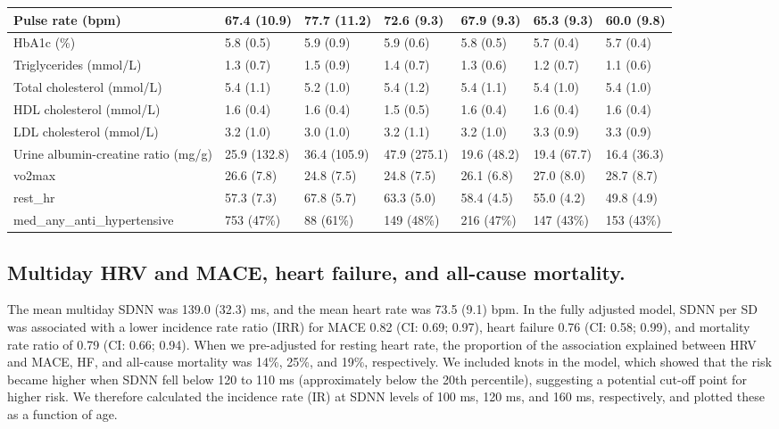 \documentclass[
  a4paper,
  headsepline=true,
  open=any]{scrbook}
\begin{document}
\begin{table}
{\begin{tabular}{l|l|l|l|l|l|l}
\hline
Pulse rate (bpm) & 67.4 (10.9) & 77.7 (11.2) & 72.6 (9.3) & 67.9 (9.3) & 65.3 (9.3) & 60.0 (9.8)\\
\hline
HbA1c (\%) & 5.8 (0.5) & 5.9 (0.9) & 5.9 (0.6) & 5.8 (0.5) & 5.7 (0.4) & 5.7 (0.4)\\
\hline
Triglycerides (mmol/L) & 1.3 (0.7) & 1.5 (0.9) & 1.4 (0.7) & 1.3 (0.6) & 1.2 (0.7) & 1.1 (0.6)\\
\hline
Total cholesterol (mmol/L) & 5.4 (1.1) & 5.2 (1.0) & 5.4 (1.2) & 5.4 (1.1) & 5.4 (1.0) & 5.4 (1.0)\\
\hline
HDL cholesterol (mmol/L) & 1.6 (0.4) & 1.6 (0.4) & 1.5 (0.5) & 1.6 (0.4) & 1.6 (0.4) & 1.6 (0.4)\\
\hline
LDL cholesterol (mmol/L) & 3.2 (1.0) & 3.0 (1.0) & 3.2 (1.1) & 3.2 (1.0) & 3.3 (0.9) & 3.3 (0.9)\\
\hline
Urine albumin-creatine ratio (mg/g) & 25.9 (132.8) & 36.4 (105.9) & 47.9 (275.1) & 19.6 (48.2) & 19.4 (67.7) & 16.4 (36.3)\\
\hline
vo2max & 26.6 (7.8) & 24.8 (7.5) & 24.8 (7.5) & 26.1 (6.8) & 27.0 (8.0) & 28.7 (8.7)\\
\hline
rest\_hr & 57.3 (7.3) & 67.8 (5.7) & 63.3 (5.0) & 58.4 (4.5) & 55.0 (4.2) & 49.8 (4.9)\\
\hline
med\_any\_anti\_hypertensive & 753 (47\%) & 88 (61\%) & 149 (48\%) & 216 (47\%) & 147 (43\%) & 153 (43\%)\\
\hline
\end{tabular}}
\end{table}

\hypertarget{multiday-hrv-and-mace-heart-failure-and-all-cause-mortality.}{%
\subsection{Multiday HRV and MACE, heart failure, and all-cause
mortality.}\label{multiday-hrv-and-mace-heart-failure-and-all-cause-mortality.}}

The mean multiday SDNN was 139.0 (32.3) ms, and the mean heart rate was
73.5 (9.1) bpm. In the fully adjusted model, SDNN per SD was associated
with a lower incidence rate ratio (IRR) for MACE 0.82 (CI: 0.69; 0.97),
heart failure 0.76 (CI: 0.58; 0.99), and mortality rate ratio of 0.79
(CI: 0.66; 0.94). When we pre-adjusted for resting heart rate, the
proportion of the association explained between HRV and MACE, HF, and
all-cause mortality was 14\%, 25\%, and 19\%, respectively. We included
knots in the model, which showed that the risk became higher when SDNN
fell below 120 to 110 ms (approximately below the 20th percentile),
suggesting a potential cut-off point for higher risk. We therefore
calculated the incidence rate (IR) at SDNN levels of 100 ms, 120 ms, and
160 ms, respectively, and plotted these as a function of age.
\end{document}
